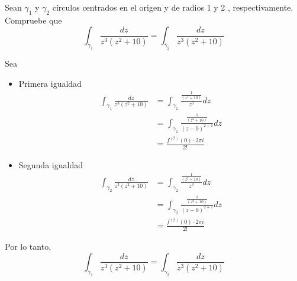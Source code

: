 \begin{problema}
    Sean $\gamma_1$ y $\gamma_2$ círculos centrados en el origen y de radios 1 y 2 , respectivamente. Compruebe que
$$
\int_{\gamma_1} \frac{d z}{z^3\left(z^2+10\right)}=\int_{\gamma_2} \frac{d z}{z^3\left(z^2+10\right)}
$$
    \begin{dem}
        Sea
        \begin{itemize}
            \item Primera igualdad \begin{align*}
                \int_{\gamma_1} \frac{d z}{z^3\left(z^2+10\right)} &= \int_{\gamma_1} \frac{\frac{1}{\left(z^2+10\right)}}{z^3}dz\\
                &= \int_{\gamma_1} \frac{\frac{1}{\left(z^2+10\right)}}{(z-0)^{2+1}}dz\\
                &= \frac{f^{(2)}(0)\cdot 2\pi i}{2!}
            \end{align*}
            \item Segunda igualdad \begin{align*}
                \int_{\gamma_2} \frac{d z}{z^3\left(z^2+10\right)} &= \int_{\gamma_2} \frac{\frac{1}{\left(z^2+10\right)}}{z^3}dz\\
                &= \int_{\gamma_2} \frac{\frac{1}{\left(z^2+10\right)}}{(z-0)^{2+1}}dz\\
                &= \frac{f^{(2)}(0)\cdot 2\pi i}{2!}
            \end{align*}
        \end{itemize}
        Por lo tanto, 
        $$
\int_{\gamma_1} \frac{d z}{z^3\left(z^2+10\right)}=\int_{\gamma_2} \frac{d z}{z^3\left(z^2+10\right)}
$$
    \end{dem}
\end{problema}


